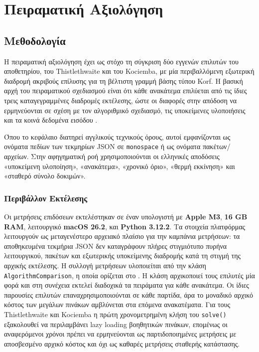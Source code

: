 \chapter{Πειραματική Αξιολόγηση}
\label{ch:evaluation}

\section{Μεθοδολογία}

Η πειραματική αξιολόγηση έχει ως στόχο τη σύγκριση δύο εγγενών επιλυτών του αποθετηρίου, του Thistlethwaite και του Kociemba, με μία περιβαλλόμενη εξωτερική διαδρομή ακριβούς επίλυσης για τη βέλτιστη γραμμή βάσης τύπου Korf. Η βασική αρχή του πειραματικού σχεδιασμού είναι ότι κάθε ανακάτεμα επιλύεται από τις ίδιες τρεις καταγεγραμμένες διαδρομές εκτέλεσης, ώστε οι διαφορές στην απόδοση να ερμηνεύονται σε σχέση με τον αλγοριθμικό σχεδιασμό, τις υποκείμενες υλοποιήσεις και τα κοινά δεδομένα εισόδου \cite{mcgeoch2001experimental,barr1995designing,johnson2002theoreticians}.

Όπου το κεφάλαιο διατηρεί αγγλικούς τεχνικούς όρους, αυτοί εμφανίζονται ως ονόματα πεδίων των τεκμηρίων JSON σε \texttt{monospace} ή ως ονόματα πακέτων/αρχείων. Στην αφηγηματική ροή χρησιμοποιούνται οι ελληνικές αποδόσεις «υποκείμενη υλοποίηση», «ανακάτεμα», «χρονικό όριο», «θερμή εκκίνηση» και «σταθερό σύνολο δοκιμών».

\subsection{Περιβάλλον Εκτέλεσης}

Οι μετρήσεις επιδόσεων εκτελέστηκαν σε έναν υπολογιστή με \textbf{Apple M3},
\textbf{16 GB RAM}, λειτουργικό \textbf{macOS 26.2}, και \textbf{Python 3.12.2}.
Τα στοιχεία πλατφόρμας λειτουργούν ως μεταγενέστερο αρχειακό πλαίσιο για την
καμπάνια μετρήσεων: τα αποθηκευμένα τεκμήρια JSON δεν καταγράφουν πλήρες
στιγμιότυπο πυρήνα λειτουργικού, πακέτων και εξωτερικής υποκείμενης διαδρομής κατά τη στιγμή
της αρχικής εκτέλεσης.
Η συλλογή μετρήσεων υλοποιείται από την κλάση \texttt{AlgorithmComparison},
η οποία ορίζεται στο . Η
κλάση αρχικοποιεί τους επιλυτές μία φορά και στη συνέχεια εκτελεί διαδοχικά τα
πειράματα για κάθε ανακάτεμα. Οι ίδιες παρουσίες επιλυτών επαναχρησιμοποιούνται
σε κάθε παρτίδα, άρα το μοναδικό αρχικό κόστος των μεγάλων πινάκων αμβλύνεται στα
επόμενα ανακατέματα. Για τους Thistlethwaite και Kociemba η πρώτη χρονομετρημένη
κλήση του \texttt{solve()} εξακολουθεί να περιλαμβάνει lazy loading βοηθητικών
πινάκων, επομένως οι αναφερόμενοι χρόνοι πρέπει να ερμηνεύονται ως
παρτιδοποιημένες μετρήσεις με αποσβεσμένο αρχικό κόστος και όχι ως καθαρές
μετρήσεις σταθερής κατάστασης.

